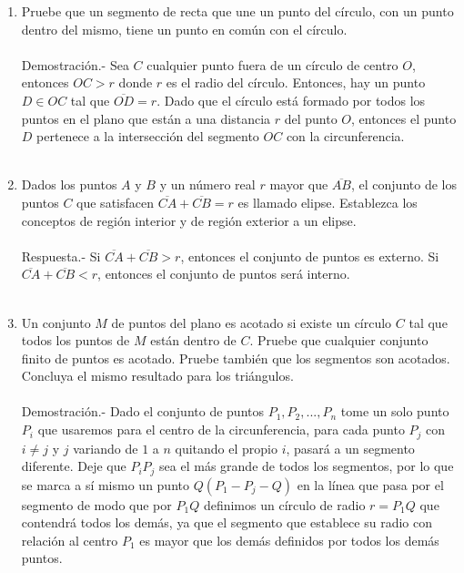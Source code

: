 \begin{enumerate}
    \item Pruebe que un segmento de recta que une un punto del círculo, con un punto dentro del mismo, tiene un punto en común con el círculo.\\\\
    Demostración.-\; Sea $C$ cualquier punto fuera de un círculo de centro $O$, entonces $OC> r$ donde $r$ es el radio del círculo. Entonces, hay un punto $D \in OC$ tal que $\overline{OD} = r$. Dado que el círculo está formado por todos los puntos en el plano que están a una distancia $r$ del punto $O$, entonces el punto $D$ pertenece a la intersección del segmento $OC$ con la circunferencia.\\\\

    \item Dados los puntos $A$ y $B$ y un número real $r$ mayor que $\overline{AB}$, el conjunto de los puntos $C$ que satisfacen $\overline{CA}+\overline{CB}=r$ es llamado elipse. Establezca los conceptos de región interior y de región exterior a un elipse.\\\\
    Respuesta.-\; Si $\overline{CA} + \overline{CB}> r$, entonces el conjunto de puntos es externo. Si $\overline{CA} + \overline{CB} <r$, entonces el conjunto de puntos será interno.\\\\

    \item Un conjunto $M$ de puntos del plano es acotado si existe un círculo $C$ tal que todos los puntos de $M$ están dentro de $C$. Pruebe que cualquier conjunto finito de puntos es acotado. Pruebe también que los segmentos son acotados. Concluya el mismo resultado para los triángulos.\\\\
    Demostración.-\; Dado el conjunto de puntos $P_1, P_2, ..., P_n$ tome un solo punto $P_i$ que usaremos para el centro de la circunferencia, para cada punto $P_j$ con $i\neq j$ y $j$ variando de $1$ a $n$ quitando el propio $i$, pasará a un segmento diferente. Deje que $P_i P_j$ sea el más grande de todos los segmentos, por lo que se marca a sí mismo un punto $Q (P_1 - P_j - Q)$ en la línea que pasa por el segmento de modo que por $P_1 Q$ definimos un círculo de radio $r = P_1 Q$ que contendrá todos los demás, ya que el segmento que establece su radio con relación al centro $P_1$ es mayor que los demás definidos por todos los demás puntos.\\\\


\end{enumerate}
